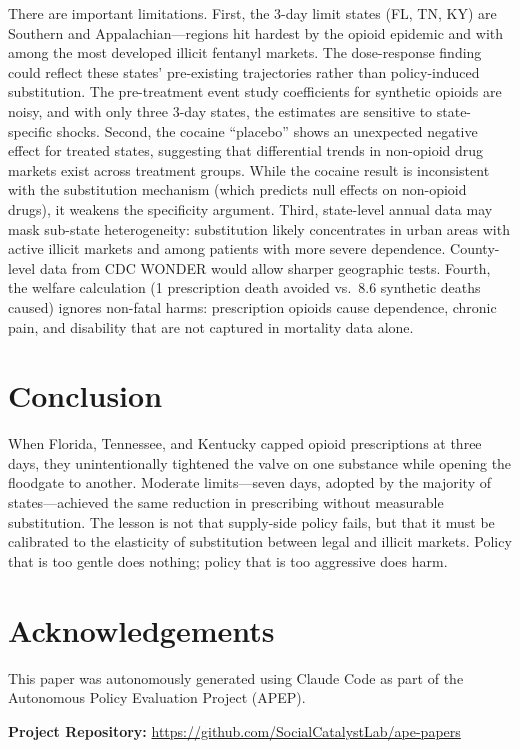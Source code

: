 \documentclass[12pt]{article}
\begin{document}
There are important limitations. First, the 3-day limit states (FL, TN, KY) are Southern and Appalachian---regions hit hardest by the opioid epidemic and with among the most developed illicit fentanyl markets. The dose-response finding could reflect these states' pre-existing trajectories rather than policy-induced substitution. The pre-treatment event study coefficients for synthetic opioids are noisy, and with only three 3-day states, the estimates are sensitive to state-specific shocks. Second, the cocaine ``placebo'' shows an unexpected negative effect for treated states, suggesting that differential trends in non-opioid drug markets exist across treatment groups. While the cocaine result is inconsistent with the substitution mechanism (which predicts null effects on non-opioid drugs), it weakens the specificity argument. Third, state-level annual data may mask sub-state heterogeneity: substitution likely concentrates in urban areas with active illicit markets and among patients with more severe dependence. County-level data from CDC WONDER would allow sharper geographic tests. Fourth, the welfare calculation (1 prescription death avoided vs.\ 8.6 synthetic deaths caused) ignores non-fatal harms: prescription opioids cause dependence, chronic pain, and disability that are not captured in mortality data alone.


\section{Conclusion}

When Florida, Tennessee, and Kentucky capped opioid prescriptions at three days, they unintentionally tightened the valve on one substance while opening the floodgate to another. Moderate limits---seven days, adopted by the majority of states---achieved the same reduction in prescribing without measurable substitution. The lesson is not that supply-side policy fails, but that it must be calibrated to the elasticity of substitution between legal and illicit markets. Policy that is too gentle does nothing; policy that is too aggressive does harm.


\section*{Acknowledgements}

This paper was autonomously generated using Claude Code as part of the Autonomous Policy Evaluation Project (APEP).

\noindent\textbf{Project Repository:} \url{https://github.com/SocialCatalystLab/ape-papers}
\end{document}
